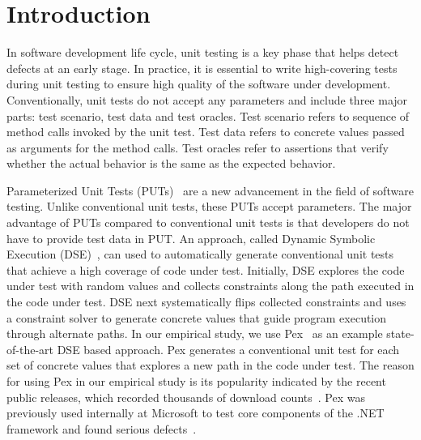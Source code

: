 \section{Introduction}
\label{sec:intro}

In software development life cycle, unit testing is a key phase that helps detect defects at an early stage. In practice, it is essential to write high-covering tests during unit testing to ensure high quality of the software under development. Conventionally, unit tests do not accept any parameters and include three major parts: test scenario, test data and test oracles. Test scenario refers to sequence of method calls invoked by the unit test. Test data refers to concrete values passed as arguments for the method calls. Test oracles refer to assertions that verify whether the actual behavior is the same as the expected behavior. 

Parameterized Unit Tests (PUTs)~\cite{tillmann05:parameterized} are a new advancement in the field of software testing. Unlike conventional unit tests, these PUTs accept parameters. The major advantage of PUTs compared to conventional unit tests is that developers do not have to provide test data in PUT. An approach, called Dynamic Symbolic Execution (DSE)~\cite{king:symex, godefroid05:dart, sen07:cute}, can used to automatically generate conventional unit tests that achieve a high coverage of code under test. Initially, DSE explores the code under test with random values and collects constraints along the path executed in the code under test. DSE next systematically flips collected constraints and uses a constraint solver to generate concrete values that guide program execution through alternate paths. In our empirical study, we use Pex~\cite{tillmann08:pex, pex:rel} as an example state-of-the-art DSE based approach. Pex generates a conventional unit test for each set of concrete values that explores a new path in the code under test. The reason for using Pex in our empirical study is its popularity indicated by the recent public releases, which recorded thousands of download counts~\cite{pex:rel}. Pex was previously used internally at Microsoft to test core components of the .NET framework and found serious defects~\cite{tillmann08:pex}.

